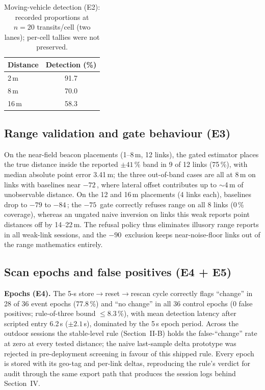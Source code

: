 \documentclass[journal,10pt]{IEEEtran}
\newcommand{\dBm}{\text{dBm}}
\begin{document}
\begin{table}[htbp]
\centering
\caption{Moving-vehicle detection (E2): recorded proportions at $n = 20$
transits/cell (two lanes); per-cell tallies were not preserved.}
\label{tab:vehicle_det}
\footnotesize
\begin{tabular}{@{}lc@{}}
\toprule
\textbf{Distance} & \textbf{Detection (\%)} \\
\midrule
2\,m  & 91.7 \\
8\,m  & 70.0 \\
16\,m & 58.3 \\
\bottomrule
\end{tabular}
\end{table}

\subsection{Range validation and gate behaviour (E3)}
On the near-field beacon placements (1--8\,m, 12 links), the gated estimator
places the true distance inside the reported $\pm41\,\%$ band in 9 of 12 links
(75\,\%), with median absolute point error 3.41\,m; the three out-of-band
cases are all at 8\,m on links with baselines near $-72$\,\dBm, where lateral
offset contributes up to $\sim$4\,m of unobservable distance. On the 12 and
16\,m placements (4 links each), baselines drop to $-79$ to $-84$\,\dBm; the
$-75$\,\dBm{} gate correctly refuses range on all 8 links (0\,\% coverage),
whereas an ungated naive inversion on links this weak reports point distances
off by 14--22\,m. The refusal policy thus eliminates illusory range reports in
all weak-link sessions, and the $-90$\,\dBm{} exclusion keeps near-noise-floor
links out of the range mathematics entirely.

\subsection{Scan epochs and false positives (E4 + E5)}
\textbf{Epochs (E4).} The 5-s store$\to$reset$\to$rescan cycle correctly flags
``change'' in 28 of 36 event epochs (77.8\,\%) and ``no change'' in all 36
control epochs (0 false positives; rule-of-three bound $\leq8.3\,\%$), with
mean detection latency after scripted entry 6.2\,s ($\pm2.1$\,s), dominated by
the 5\,s epoch period. Across the outdoor sessions the stable-level rule
(Section~II-B) holds the false-``change'' rate at zero at every tested
distance; the naive last-sample delta prototype was rejected in pre-deployment
screening in favour of this shipped rule. Every epoch is stored with its
geo-tag and per-link deltas, reproducing the rule's verdict for audit through
the same export path that produces the session logs behind Section~IV.
\end{document}
